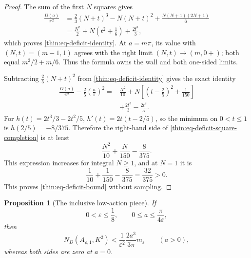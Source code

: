 \documentclass[11pt]{article}
\numberwithin{equation}{section}
\newtheorem{proposition}[theorem]{Proposition}
\theoremstyle{definition}
\theoremstyle{remark}
\begin{document}
\begin{proof}
The sum of the first \(N\) squares gives
\[
\begin{aligned}
  \frac{D(a)}{\pi^2}
  &=\frac23(N+t)^3-N(N+t)^2
    +\frac{N(N+1)(2N+1)}6 \\
  &=\frac{N^2}{2}+N\left(t^2+\frac16\right)+\frac{2t^3}{3},
\end{aligned}
\]
which proves \eqref{thin:eq-deficit-identity}.  At \(a=m\pi\), its value
with \((N,t)=(m-1,1)\) agrees with the right limit \((N,t)\to(m,0+)\);
both equal \(m^2/2+m/6\).  Thus the formula owns the wall and both
one-sided limits.

Subtracting \(\tfrac25(N+t)^2\) from
\eqref{thin:eq-deficit-identity} gives the exact identity
\begin{equation}
\begin{aligned}
  \frac{D(a)}{\pi^2}-\frac25\left(\frac a\pi\right)^2
  ={}&\frac{N^2}{10}
  +N\left[\left(t-\frac25\right)^2+\frac1{150}\right] \\
  &+\frac{2t^3}{3}-\frac{2t^2}{5}.
\end{aligned}
  \label{thin:eq-deficit-square-completion}
\end{equation}
For \(h(t)=2t^3/3-2t^2/5\),
\(h'(t)=2t(t-2/5)\), so the minimum on \(0<t\leq1\) is
\(h(2/5)=-8/375\).  Therefore the right-hand side of
\eqref{thin:eq-deficit-square-completion} is at least
\[
  \frac{N^2}{10}+\frac{N}{150}-\frac8{375}.
\]
This expression increases for integral \(N\geq1\), and at \(N=1\) it is
\[
  \frac1{10}+\frac1{150}-\frac8{375}
  =\frac{32}{375}>0.
\]
This proves \eqref{thin:eq-deficit-bound} without sampling.
\end{proof}

\begin{proposition}[The inclusive low-action piece]
\label{thin:prop-low-piece}
If
\[
  0<\varepsilon\leq\frac18,
  \qquad 0\leq a\leq\frac{\pi}{4\varepsilon},
\]
then
\begin{equation}
  N_D(A_{\rho,1},K^2)
  <\frac{1}{\varepsilon^2}\frac{2a^3}{3\pi}m_\varepsilon
  \qquad(a>0),
  \label{thin:eq-low-piece-conclusion}
\end{equation}
whereas both sides are zero at \(a=0\).
\end{proposition}
\end{document}
